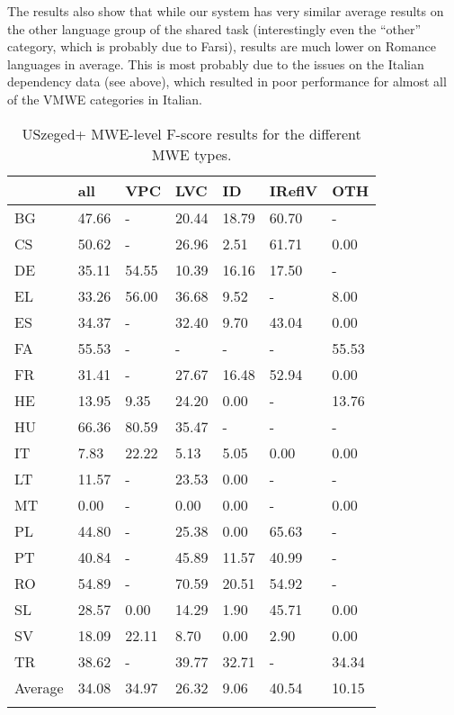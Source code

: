 \documentclass[output=paper,
modfonts,
]{langscibook}
\begin{document}
The results also show that while our system has very similar average results on the other language group of the shared task (interestingly even the ``other'' category, which is probably due to Farsi), results are much lower on Romance languages in average. This is most probably due to the issues on the Italian dependency data (see above), which resulted in poor performance for almost all of the VMWE categories in Italian.


\begin{table}
\centering
\caption{USzeged+ MWE-level F-score results for the different MWE types.}
\label{mwelevel}
\begin{tabular}{lllllll}
  \lsptoprule
 & all   & VPC    & LVC    & ID     & IReflV & OTH    \\
 \midrule
BG  & 47.66 &  -       & 20.44 & 18.79 & 60.70 &  -   \\
CS  & 50.62 &  -       & 26.96 & 2.51 & 61.71 & 0.00\\
DE  & 35.11 & 54.55 & 10.39 & 16.16 & 17.50 &  -   \\
EL  & 33.26 & 56.00 & 36.68 & 9.52 &  -       & 8.00\\
ES  & 34.37 &  -       & 32.40 & 9.70 & 43.04 & 0.00\\
FA  & 55.53 &  -       &  -       &  -       &  -       & 55.53 \\
FR  & 31.41 &  -       & 27.67 & 16.48 & 52.94 & 0.00\\
HE  & 13.95 & 9.35 & 24.20 & 0.00 &  -       & 13.76 \\
HU  & 66.36 & 80.59 & 35.47 &  -       &  -       &  -   \\
IT  & 7.83 & 22.22 & 5.13 & 5.05 & 0.00 & 0.00\\
LT  & 11.57 &  -       & 23.53 & 0.00 &  -       &  -   \\
MT  & 0.00 &  -       & 0.00 & 0.00 &  -       & 0.00\\
PL  & 44.80 &  -       & 25.38 & 0.00 & 65.63 &  -   \\
PT  & 40.84 &  -       & 45.89 & 11.57 & 40.99 &  -   \\
RO  & 54.89 &  -       & 70.59 & 20.51 & 54.92 &  -   \\
SL  & 28.57 & 0.00 & 14.29 & 1.90 & 45.71 & 0.00\\
SV  & 18.09 & 22.11 & 8.70 & 0.00 & 2.90 & 0.00\\
TR  & 38.62 &  -       & 39.77 & 32.71 &  -       & 34.34 \\
 \midrule
Average  & 34.08 & 34.97 & 26.32 & 9.06 & 40.54 & 10.15 \\


  \lspbottomrule
\end{tabular}
\end{table}
\end{document}
